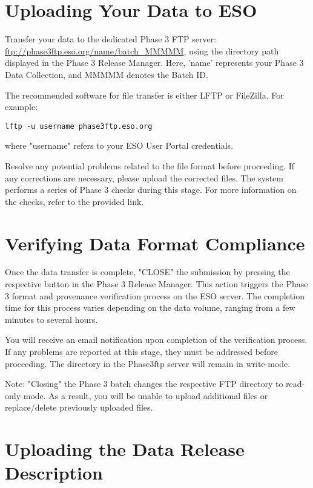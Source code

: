 \documentclass[a4paper,10pt]{book}
\begin{document}
\section{Uploading Your Data to ESO}

Transfer your data to the dedicated Phase 3 FTP server: \url{ftp://phase3ftp.eso.org/name/batch_MMMMM}, using the directory path displayed in the Phase 3 Release Manager. Here, 'name' represents your Phase 3 Data Collection, and MMMMM denotes the Batch ID.

The recommended software for file transfer is either LFTP or FileZilla. For example:

\begin{verbatim}
lftp -u username phase3ftp.eso.org
\end{verbatim}

where "username" refers to your ESO User Portal credentials.

Resolve any potential problems related to the file format before proceeding. If any corrections are necessary, please upload the corrected files. The system performs a series of Phase 3 checks during this stage. For more information on the checks, refer to the provided link.

\section{Verifying Data Format Compliance}

Once the data transfer is complete, "CLOSE" the submission by pressing the respective button in the Phase 3 Release Manager. This action triggers the Phase 3 format and provenance verification process on the ESO server. The completion time for this process varies depending on the data volume, ranging from a few minutes to several hours.

You will receive an email notification upon completion of the verification process. If any problems are reported at this stage, they must be addressed before proceeding. The directory in the Phase3ftp server will remain in write-mode.

Note: "Closing" the Phase 3 batch changes the respective FTP directory to read-only mode. As a result, you will be unable to upload additional files or replace/delete previously uploaded files.

\section{Uploading the Data Release Description}
\end{document}
